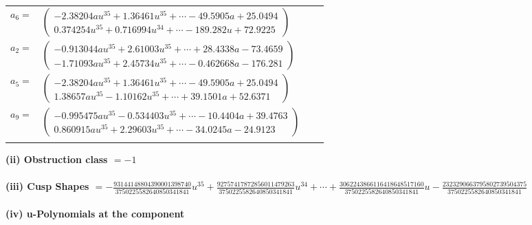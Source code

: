 \documentclass[1p]{elsarticle_modified}
\theoremstyle{definition}
\begin{document}
\begin{tabular}{m{7pt} m{180pt} m{7pt} m{180pt} }
\flushright $a_{6}=$&$\begin{pmatrix}-2.38204 a u^{35}+1.36461 u^{35}+\cdots-49.5905 a+25.0494\\0.374254 u^{35}+0.716994 u^{34}+\cdots-189.282 u+72.9225\end{pmatrix}$ \\
\flushright $a_{2}=$&$\begin{pmatrix}-0.913044 a u^{35}+2.61003 u^{35}+\cdots+28.4338 a-73.4659\\-1.71093 a u^{35}+2.45734 u^{35}+\cdots-0.462668 a-176.281\end{pmatrix}$ \\
\flushright $a_{5}=$&$\begin{pmatrix}-2.38204 a u^{35}+1.36461 u^{35}+\cdots-49.5905 a+25.0494\\1.38657 a u^{35}-1.10162 u^{35}+\cdots+39.1501 a+52.6371\end{pmatrix}$ \\
\flushright $a_{9}=$&$\begin{pmatrix}-0.995475 a u^{35}-0.534403 u^{35}+\cdots-10.4404 a+39.4763\\0.860915 a u^{35}+2.29603 u^{35}+\cdots-34.0245 a-24.9123\end{pmatrix}$\\&\end{tabular}
\flushleft \textbf{(ii) Obstruction class $= -1$}\\~\\
\flushleft \textbf{(iii) Cusp Shapes $= -\frac{93144148804390001398740}{3750225582640850341841} u^{35}+\frac{92757417872856011479263}{3750225582640850341841} u^{34}+\cdots+\frac{3062243866116418648517160}{3750225582640850341841} u-\frac{2323290663795802739504375}{3750225582640850341841}$}\\~\\
\newpage\renewcommand{\arraystretch}{1}
\flushleft \textbf{(iv) u-Polynomials at the component}\newline \\
\end{document}

